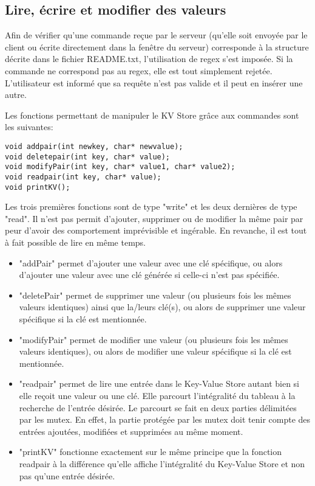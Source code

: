 \documentclass[11pt,a4paper]{article}
\begin{document}
\subsection{Lire, écrire et modifier des valeurs}
Afin de vérifier qu'une commande reçue par le serveur (qu'elle soit envoyée par le client ou écrite directement dans la fenêtre du serveur) corresponde à la structure décrite dans le fichier README.txt, l'utilisation de regex s'est imposée. Si la commande ne correspond pas au regex, elle est tout simplement rejetée. L'utilisateur est informé que sa requête n'est pas valide et il peut en insérer une autre.

Les fonctions permettant de manipuler le KV Store grâce aux commandes sont les suivantes:
\begin{lstlisting}
void addpair(int newkey, char* newvalue);
void deletepair(int key, char* value);
void modifyPair(int key, char* value1, char* value2);
void readpair(int key, char* value);
void printKV();
\end{lstlisting}
Les trois premières fonctions sont de type "write" et les deux dernières de type "read". Il n'est pas permit d'ajouter, supprimer ou de modifier la même pair par peur d'avoir des comportement imprévisible et ingérable. En revanche, il est tout à fait possible de lire en même temps.

\begin{itemize}
\item "addPair" permet d'ajouter une valeur avec une clé spécifique, ou alors d'ajouter une valeur avec une clé générée si celle-ci n'est pas spécifiée.
\item "deletePair" permet de supprimer une valeur (ou plusieurs fois les mêmes valeurs identiques) ainsi que la/leurs clé(s), ou alors de supprimer une valeur spécifique si la clé est mentionnée.
\item "modifyPair" permet de modifier une valeur (ou plusieurs fois les mêmes valeurs identiques), ou alors de modifier une valeur spécifique si la clé est mentionnée.
\item "readpair" permet de lire une entrée dans le Key-Value Store autant bien si elle reçoit une valeur ou une clé. Elle parcourt l'intégralité du tableau à la recherche de l'entrée désirée. Le parcourt se fait en deux parties délimitées par les mutex. En effet, la partie protégée par les mutex doit tenir compte des entrées ajoutées, modifiées et supprimées au même moment.
\item "printKV" fonctionne exactement sur le même principe que la fonction readpair à la différence qu'elle affiche l'intégralité du Key-Value Store et non pas qu'une entrée désirée.
\end{itemize}
\end{document}
